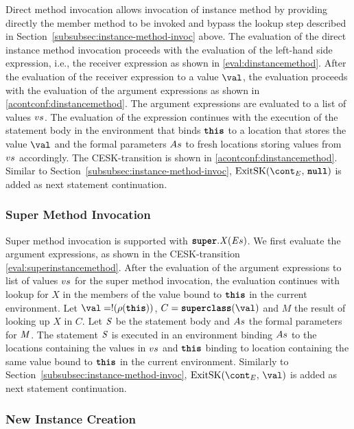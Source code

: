 \documentclass[a4paper,oneside,fleqn]{article}
\newcommand{\synt}[1]{\ensuremath{\text{\textbf{\texttt{#1}}}}}
\DeclareMathOperator{\nnull}{\synt{null}}
\DeclareMathOperator{\superclass}{\synt{superclass}}
\newcommand{\this}{\synt{this}}
\newcommand{\idmeta}{\ensuremath{\mathit{X}}}
\begin{document}
Direct method invocation allows invocation of instance method by providing directly the member method to be invoked and bypass the lookup step described in Section~\ref{subsubsec:instance-method-invoc} above.
The evaluation of the direct instance method invocation proceeds with the evaluation of the left-hand side expression, i.e., the receiver expression as shown in \eqref{eval:dinstancemethod}.
After the evaluation of the receiver expression to a value $\val$, the evaluation proceeds with the evaluation of the argument expressions as shown in \eqref{acontconf:dinstancemethod}.
The argument expressions are evaluated to a list of values $vs$.
The evaluation of the expression continues with the execution of the statement body in the environment that binds $\this$ to a location that stores the value $\val$ and the formal parameters $As$ to fresh locations storing values from $vs$ accordingly.
The CESK-transition is shown in \eqref{acontconf:dinstancemethod}.
Similar to Section~\ref{subsubsec:instance-method-invoc}, $\ExitSK{\nnull}$ is added as next statement continuation.


\subsubsection{Super Method Invocation}
\label{subsubsec:super-method-invoc}

Super method invocation is supported with $\SuperMethodInvocation{\idmeta}{\expressionsmeta}$.
We first evaluate the argument expressions, as shown in the CESK-transition \eqref{eval:superinstancemethod}.
After the evaluation of the argument expressions to list of values $vs$ for the super method invocation, the evaluation continues with lookup for $\idmeta$ in the members of the value bound to $\this$ in the current environment.
Let $\val = \deref{(\env(\this))}$, $C = \superclass(\val)$ and $M$ the result of looking up $\idmeta$ in $C$.
Let $\mathit{S}$ be the statement body and $As$ the formal parameters for $\mathit{M}$.
The statement $\mathit{S}$ is executed in an environment binding $As$ to the locations containing the values in $vs$ and $\this$ binding to location containing the same value bound to $\this$ in the current environment.
Similarly to Section~\ref{subsubsec:instance-method-invoc}, $\ExitSK{\val}$ is added as next statement continuation.


\subsubsection{New Instance Creation}
\label{subsubsec:new-instance}
\end{document}
